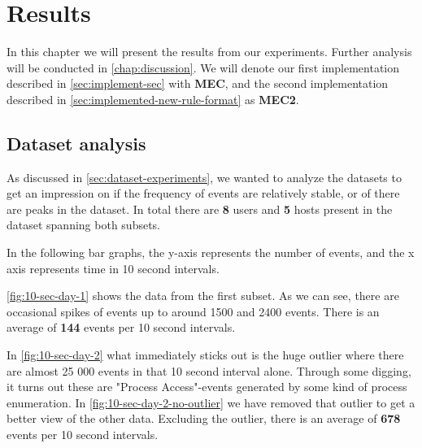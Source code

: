 \chapter{Results}
\label{chap:results}
In this chapter we will present the results from our experiments. Further analysis will be conducted in \cref{chap:discussion}. We will denote our first implementation described in \cref{sec:implement-sec} with \textbf{MEC}, and the second implementation described in \cref{sec:implemented-new-rule-format} as \textbf{MEC2}.

\section{Dataset analysis}

As discussed in \cref{sec:dataset-experiments}, we wanted to analyze the datasets to get an impression on if the frequency of events are relatively stable, or of there are peaks in the dataset.
In total there are \textbf{8} users and \textbf{5} hosts present in the dataset spanning both subsets.

In the following bar graphs, the y-axis represents the number of events, and the x axis represents time in 10 second intervals.

\cref{fig:10-sec-day-1} shows the data from the first subset. As we can see, there are occasional spikes of events up to around 1500 and 2400 events. There is an average of \textbf{144} events per 10 second intervals.

In \cref{fig:10-sec-day-2} what immediately sticks out is the huge outlier where there are almost 25 000 events in that 10 second interval alone. Through some digging, it turns out these are "Process Access"-events generated by some kind of process enumeration. In 
\cref{fig:10-sec-day-2-no-outlier} we have removed that outlier to get a better view of the other data. Excluding the outlier, there is an average of \textbf{678} events per 10 second intervals.

